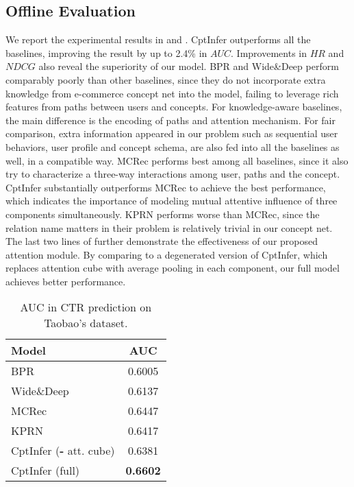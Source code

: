 \subsection{Offline Evaluation}
\label{sec:off_eval}

We report the experimental results in  and .
CptInfer outperforms all the baselines, improving the result by up to 2.4\% in $AUC$.
Improvements in $HR$ and $NDCG$ also reveal the superiority of our model.
BPR and Wide\&Deep perform comparably poorly than other baselines, since they do not incorporate extra knowledge from e-commerce concept net into the model, failing to leverage rich features from paths between users and concepts.
For knowledge-aware baselines, 
the main difference is the encoding of paths and attention mechanism.
For fair comparison, 
extra information appeared in our problem such as sequential user behaviors, user profile and concept schema, 
are also fed into all the baselines as well, in a compatible way.
MCRec performs best among all baselines, 
since it also try to characterize a three-way interactions among user, paths and the concept.
CptInfer substantially outperforms MCRec to achieve the best performance,
which indicates the importance of modeling mutual attentive influence of three components simultaneously.
KPRN performs worse than MCRec, since the relation name matters in their problem is relatively trivial in our concept net.
The last two lines of  further demonstrate the effectiveness of our proposed attention module. 
By comparing to a degenerated version of CptInfer, which replaces attention cube with average pooling in each component, 
our full model achieves better performance.
\begin{table}[th]
	\centering
	\begin{tabular}{l|c}
		\hline
		Model &   AUC \\
		\hline
		BPR \cite{rendle2009bpr} &  0.6005 \\
		Wide\&Deep \cite{cheng2016wide} &  0.6137 \\
		MCRec \cite{hu2018leveraging} &  0.6447 \\
		KPRN \cite{wang2018explainable} &  0.6417 \\
		\hline
		CptInfer (\textbf{-} att. cube) &  0.6381   \\
		CptInfer (full) &  \textbf{0.6602} \\
		\hline
	\end{tabular}
	\caption{AUC in CTR prediction on Taobao's dataset.}
	\label{tab:eval_main}
\end{table}


